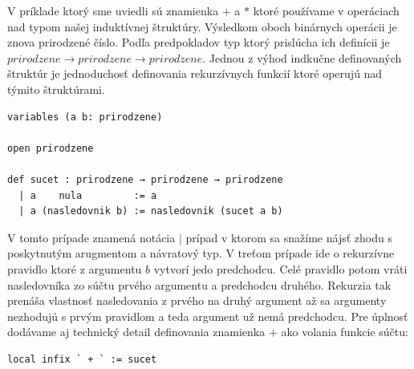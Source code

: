 \documentclass[a4paper,10pt,oneside]{report}%
\begin{document}
    V príklade ktorý sme uviedli sú znamienka $+$ a $*$ ktoré používame
v operáciach nad typom našej induktívnej štruktúry.
    Výsledkom oboch binárnych operácii je znova prirodzené číslo.
    Podľa predpokladov typ ktorý prislúcha ich definícii je
$prirodzene \to prirodzene \to prirodzene$.
    Jednou z výhod indkučne definovaných štruktúr je jednoduchosť definovania
rekurzívnych funkcií ktoré operujú nad týmito štruktúrami.
\begin{lstlisting}
variables (a b: prirodzene)

open prirodzene

def sucet : prirodzene → prirodzene → prirodzene
  | a    nula         := a
  | a (nasledovnik b) := nasledovnik (sucet a b)
\end{lstlisting}
    V tomto prípade znamená notácia $|$ prípad v ktorom sa snažíme nájsť zhodu
s poskytnutým arugmentom a návratový typ.
    V treťom prípade ide o rekurzívne pravidlo ktoré z argumentu $b$ vytvorí jedo
predchodcu.
    Celé pravidlo potom vráti nasledovníka zo súčtu prvého argumentu a predchodcu
druhého.
    Rekurzia tak prenáša vlastnosť nasledovania z prvého na druhý argument až
sa argumenty nezhodujú s prvým pravidlom a teda argument už nemá predchodcu.
    Pre úplnosť dodávame aj technický detail definovania znamienka $+$ ako volania
funkcie súčtu:
\begin{lstlisting}
local infix ` + ` := sucet
\end{lstlisting}
\end{document}
